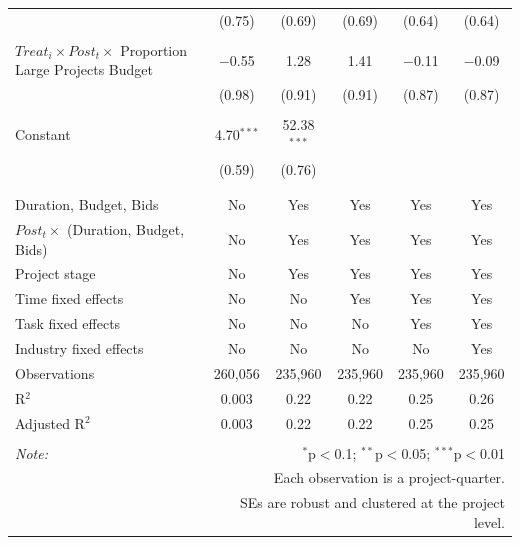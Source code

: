 \documentclass[
]{article}
\begin{document}
\begin{table}[H]
\begin{tabular}{@{\extracolsep{-2pt}}lccccc}
  & (0.75) & (0.69) & (0.69) & (0.64) & (0.64) \\ 
  & & & & & \\ 
 $Treat_i \times Post_t \times$ Proportion Large Projects Budget & $-$0.55 & 1.28 & 1.41 & $-$0.11 & $-$0.09 \\ 
  & (0.98) & (0.91) & (0.91) & (0.87) & (0.87) \\ 
  & & & & & \\ 
 Constant & 4.70$^{***}$ & 52.38$^{***}$ &  &  &  \\ 
  & (0.59) & (0.76) &  &  &  \\ 
  & & & & & \\ 
\hline \\[-1.8ex] 
Duration, Budget, Bids & No & Yes & Yes & Yes & Yes \\ 
$Post_t \times $  (Duration, Budget, Bids) & No & Yes & Yes & Yes & Yes \\ 
Project stage & No & Yes & Yes & Yes & Yes \\ 
Time fixed effects & No & No & Yes & Yes & Yes \\ 
Task fixed effects & No & No & No & Yes & Yes \\ 
Industry fixed effects & No & No & No & No & Yes \\ 
Observations & 260,056 & 235,960 & 235,960 & 235,960 & 235,960 \\ 
R$^{2}$ & 0.003 & 0.22 & 0.22 & 0.25 & 0.26 \\ 
Adjusted R$^{2}$ & 0.003 & 0.22 & 0.22 & 0.25 & 0.25 \\ 
\hline 
\hline \\[-1.8ex] 
\textit{Note:}  & \multicolumn{5}{r}{$^{*}$p$<$0.1; $^{**}$p$<$0.05; $^{***}$p$<$0.01} \\ 
 & \multicolumn{5}{r}{Each observation is a project-quarter.} \\ 
 & \multicolumn{5}{r}{SEs are robust and clustered at the project level.} \\ 
\end{tabular} 
\end{table}
\end{document}
